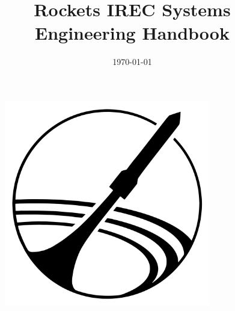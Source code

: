\documentclass[11pt,letterpaper,oneside]{memoir}
\title{Rockets IREC Systems Engineering Handbook}
\date{\today}
\begin{document}
\begin{figure}[t]
\centering
  \includegraphics[height= 9cm]{Figures/logo.png}
\end{figure}

\titlep



\renewcommand{\chaptitlefont}{\normalfont\Large\bfseries}
\newpage
\tableofcontents*  %
\renewcommand{\chaptitlefont}{\normalfont\Huge\bfseries}




\end{document}
